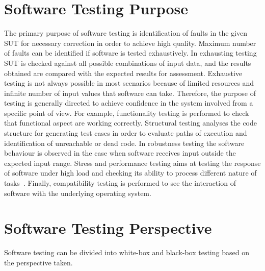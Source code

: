 \section{Software Testing Purpose}
The primary purpose of software testing is identification of faults in the given SUT for necessary correction in order to achieve high quality. Maximum number of faults can be identified if software is tested exhaustively. In exhausting testing SUT is checked against all possible combinations of input data, and the results obtained are compared with the expected results for assessment. Exhaustive testing is not always possible in most scenarios because of limited resources and infinite number of input values that software can take. Therefore, the purpose of testing is generally directed to achieve confidence in the system involved from a specific point of view. For example, functionality testing is performed to check that functional aspect are working correctly. Structural testing analyses the code structure for generating test cases in order to evaluate paths of execution and identification of unreachable or dead code. In robustness testing the software behaviour is observed in the case when software receives input outside the expected input range. Stress and performance testing aims at testing the response of software under high load and checking its ability to process different nature of tasks~\cite{cohen2005robustness}. Finally, compatibility testing is performed to see the interaction of software with the underlying operating system.

\section{Software Testing Perspective}
Software testing can be divided into white-box and black-box testing based on the perspective taken.

